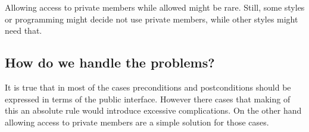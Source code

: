 Allowing access to private members while allowed might be rare. Still, some
styles or programming might decide not use private members, while other styles
might need that.

\subsection{How do we handle the problems?}

It is true that in most of the cases preconditions and postconditions should be
expressed in terms of the public interface. However there cases that making of
this an absolute rule would introduce excessive complications. On the other hand
allowing access to private members are a simple solution for those cases.


